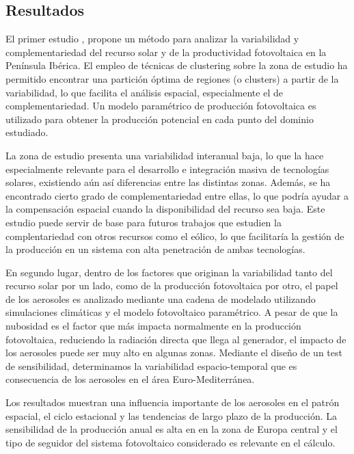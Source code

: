 \subsection{Resultados}

El primer estudio \cite*{Gutierrez2017}, propone un método para analizar la variabilidad y complementariedad del recurso solar y de la productividad fotovoltaica en la Península Ibérica. El empleo de técnicas de clustering sobre la zona de estudio ha permitido encontrar una partición óptima de regiones (o clusters) a partir de la variabilidad, lo que facilita el análisis espacial, especialmente el de complementariedad. Un modelo paramétrico de producción fotovoltaica es utilizado para obtener la producción potencial en cada punto del dominio estudiado.

La zona de estudio presenta una variabilidad interanual baja, lo que la hace especialmente relevante para el desarrollo e integración masiva de tecnologías solares, existiendo aún así diferencias entre las distintas zonas. Además, se ha encontrado cierto grado de complementariedad entre ellas, lo que podría ayudar a la compensación espacial cuando la disponibilidad del recurso sea baja. Este estudio puede servir de base para futuros trabajos que estudien la complentariedad con otros recursos como el eólico, lo que facilitaría la gestión de la producción en un sistema con alta penetración de ambas tecnologías.\\

\starbreak

En segundo lugar, dentro de los factores que originan la variabilidad tanto del recurso solar por un lado, como de la producción fotovoltaica por otro, el papel de los aerosoles es analizado mediante una cadena de modelado utilizando simulaciones climáticas y el modelo fotovoltaico param\'etrico. A pesar de que la nubosidad es el factor que más impacta normalmente en la producción fotovoltaica, reduciendo la radiación directa que llega al generador, el impacto de los aerosoles puede ser muy alto en algunas zonas. Mediante el diseño de un test de sensibilidad, determinamos la variabilidad espacio-temporal que es consecuencia de los aerosoles en el área Euro-Mediterránea.

Los resultados \cite*{Gutierrez2018} muestran una influencia importante de los aerosoles en el patrón espacial, el ciclo estacional y las tendencias de largo plazo de la producción. La sensibilidad de la producción anual es alta en en la zona de Europa central y el tipo de seguidor del sistema fotovoltaico considerado es relevante en el cálculo.

